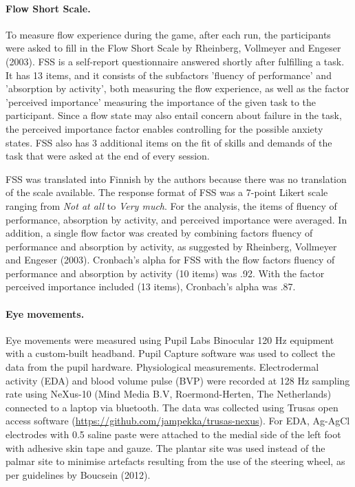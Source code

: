 \documentclass[fleqn,10pt]{wlscirep}
\begin{document}
\paragraph{Flow Short Scale.} To measure flow experience during the game, after each run, the participants were asked to fill in the Flow Short Scale by Rheinberg, Vollmeyer and Engeser (2003). FSS is a self-report questionnaire answered shortly after fulfilling a task. It has 13 items, and it consists of the subfactors 'fluency of performance' and 'absorption by activity', both measuring the flow experience, as well as the factor 'perceived importance' measuring the importance of the given task to the participant. Since a flow state may also entail concern about failure in the task, the perceived importance factor enables controlling for the possible anxiety states. FSS also has 3 additional items on the fit of skills and demands of the task that were asked at the end of every session.

FSS was translated into Finnish by the authors because there was no translation of the scale available. The response format of FSS was a 7-point Likert scale ranging from {\it Not at all} to {\it Very much}. For the analysis, the items of fluency of performance, absorption by activity, and perceived importance were averaged. In addition, a single flow factor was created by combining factors fluency of performance and absorption by activity, as suggested by Rheinberg, Vollmeyer and Engeser (2003). Cronbach's alpha for FSS with the flow factors fluency of performance and absorption by activity (10 items) was .92. With the factor perceived importance included (13 items), Cronbach's alpha was .87.

\paragraph{Eye movements.} Eye movements were measured using Pupil Labs Binocular 120 Hz equipment with a custom-built headband. Pupil Capture software was used to collect the data from the pupil hardware.
Physiological measurements. Electrodermal activity (EDA) and blood volume pulse (BVP) were recorded at 128 Hz sampling rate using NeXus-10 (Mind Media B.V, Roermond-Herten, The Netherlands) connected to a laptop via bluetooth. The data was collected using Trusas open access software (\url{https://github.com/jampekka/trusas-nexus}).
For EDA, Ag-AgCl electrodes with 0.5 saline paste were attached to the medial side of the left foot with adhesive skin tape and gauze. The plantar site was used instead of the palmar site to minimise artefacts resulting from the use of the steering wheel, as per guidelines by Boucsein (2012).
\end{document}
